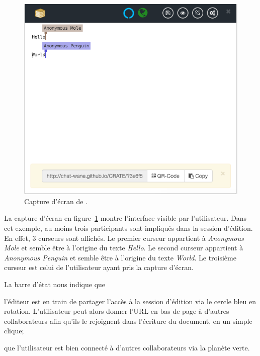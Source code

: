 \begin{figure}
  \begin{center}
    \includegraphics[scale=0.6]{img/editor/cratescreenshot.png}
    \caption[Capture d'écran de \CRATE]
    {\label{editor:img:screenshot}Capture d'écran de \CRATE.}
  \end{center}
\end{figure}

La capture d'écran en figure~\ref{editor:img:screenshot} montre l'interface
visible par l'utilisateur. Dans cet exemple, au moins trois participants sont
impliqués dans la session d'édition. En effet, 3 curseurs sont affichés. Le
premier curseur appartient à \emph{Anonymous Mole} et semble être à l'origine du
texte \emph{Hello}. Le second curseur appartient à \emph{Anonymous Penguin} et
semble être à l'origine du texte \emph{World}. Le troisième curseur est celui de
l'utilisateur ayant pris la capture d'écran.

La barre d'état nous indique que
\begin{inparaenum}[(i)]
\item l'éditeur est en train de partager l'accès à la session d'édition via le
  cercle bleu en rotation. L'utilisateur peut alors donner l'URL en bas de page
  à d'autres collaborateurs afin qu'ils le rejoignent dans l'écriture du
  document, en un simple clique;
\item que l'utilisateur est bien connecté à d'autres collaborateurs via la
  planète verte.
\end{inparaenum}

